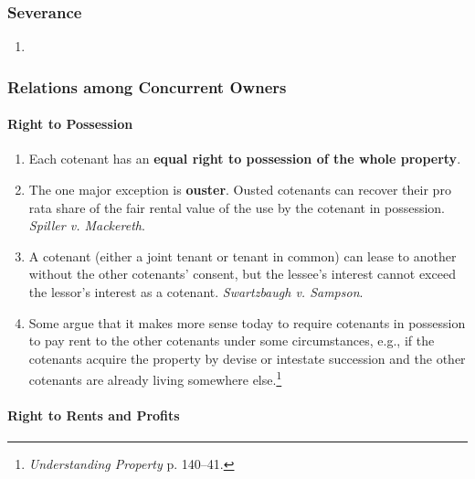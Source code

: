 \subsubsection{Severance}

\begin{enumerate}
    \item %
\end{enumerate}

\subsubsection{Relations among Concurrent Owners}

\paragraph{Right to Possession}

\begin{enumerate}
    \item Each cotenant has an \textbf{equal right to possession of the whole 
    property}.
    \item The one major exception is \textbf{ouster}. Ousted cotenants can 
    recover their pro rata share of the fair rental value of the use by the 
    cotenant in possession. \emph{Spiller v. Mackereth}.
    \item A cotenant (either a joint tenant or tenant in common)  can lease to 
    another without the other cotenants' consent, but the lessee's interest 
    cannot exceed the lessor's interest as a cotenant.  \emph{Swartzbaugh v. 
    Sampson}.
    \item Some argue that it makes more sense today to require cotenants in 
    possession to pay rent to the other cotenants under some circumstances, 
    e.g., if the cotenants acquire the property by devise or intestate 
    succession and the other cotenants are already living somewhere 
    else.\footnote{\emph{Understanding Property} p. 140--41.}
\end{enumerate}

\paragraph{Right to Rents and Profits}

